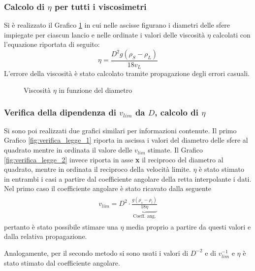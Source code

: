 \documentclass[a4paper,11pt,oneside]{article}
\begin{document}
\subsubsection*{Calcolo di $\eta$ per tutti i viscosimetri}
Si è realizzato il Grafico \ref{fig:eta} in cui nelle ascisse figurano i diametri delle sfere impiegate per ciascun lancio e nelle ordinate i valori delle viscosità $\eta$ calcolati con l'equazione riportata di seguito:
\begin{equation*}
    \eta= \frac{{D}^2g\left(\rho_S - \rho_L\right)}{18 v_{L}} 
\end{equation*}
L'errore della viscosità è stato calcolato tramite propagazione degli errori casuali.

\begin{figure}
    \centering
    \caption{Viscosità $\eta$ in funzione del diametro}
    \label{fig:eta}
\end{figure}



\subsubsection*{Verifica della dipendenza di $v_{lim}$ da $D$, calcolo di $\eta$}
Si sono poi realizzati due grafici similari per informazioni contenute. Il primo Grafico \ref{fig:verifica_legge_1} riporta in ascissa i valori del diametro delle sfere al quadrato mentre in ordinata il valore delle $v_{lim}$ stimate. Il Grafico \ref{fig:verifica_legge_2} invece riporta in asse \textbf{x} il reciproco del diametro al quadrato, mentre in ordinata il reciproco della velocità limite. $\eta$ è stato stimato in entrambi i casi a partire dal coefficiente angolare della retta interpolante i dati.\newline
Nel primo caso il coefficiente angolare è stato ricavato dalla seguente
\begin{align*}
\begin{split}
    v_{lim}=D^{2} \cdot \underbrace{\frac{g (\rho_s - \rho_l)}{18 \eta}}_\text{Coeff. ang.}
\end{split}
\end{align*}
pertanto è stato possibile stimare una $\eta$ media proprio a partire da questi valori e dalla relativa propagazione.

Analogamente, per il secondo metodo si sono usati i valori di $D^{-2}$ e di $v_{lim}^{-1}$ e $\eta$ è stato stimato dal coefficiente angolare.
\end{document}
